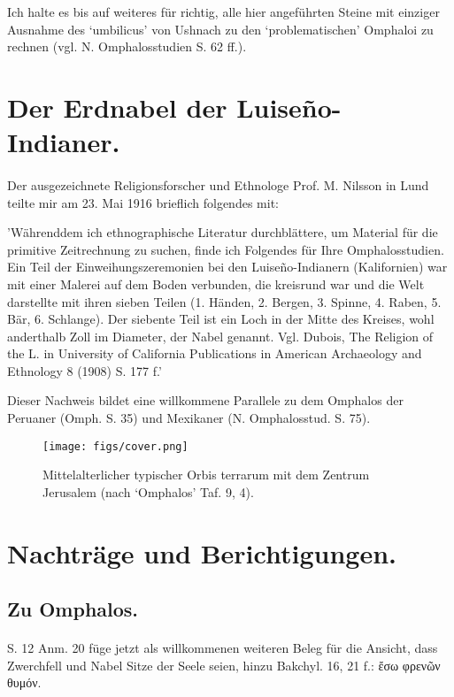 \documentclass[a4paper, 11pt, oneside]{article}
\begin{document}
Ich halte es bis auf weiteres für richtig, alle hier angeführten Steine mit einziger Ausnahme des `umbilicus' von Ushnach zu den `problematischen' Omphaloi zu rechnen (vgl. N. Omphalosstudien S. 62 ff.).
\clearpage
\section{Der Erdnabel der Luiseño-Indianer.}
\paragraph{}
Der ausgezeichnete Religionsforscher und Ethnologe Prof. M. Nilsson in Lund teilte mir am 23. Mai 1916 brieflich folgendes mit:

'Währenddem ich ethnographische Literatur durchblättere, um Material für die primitive Zeitrechnung zu suchen, finde ich Folgendes für Ihre Omphalosstudien. Ein Teil der Einweihungszeremonien bei den Luiseño-Indianern (Kalifornien) war mit einer Malerei auf dem Boden verbunden, die kreisrund war und die Welt darstellte mit ihren sieben Teilen (1. Händen, 2. Bergen, 3. Spinne, 4. Raben, 5. Bär, 6. Schlange). Der siebente Teil ist ein Loch in der Mitte des Kreises, wohl anderthalb Zoll im Diameter, der Nabel genannt. Vgl. Dubois, The Religion of the L. in University of California Publications in American Archaeology and Ethnology 8 (1908) S. 177 f.'

Dieser Nachweis bildet eine willkommene Parallele zu dem Omphalos der Peruaner (Omph. S. 35) und Mexikaner (N. Omphalosstud. S. 75).

\begin{figure}[H]
\centering
\texttt{[image: figs/cover.png]}
\caption*{Mittelalterlicher typischer Orbis terrarum mit dem Zentrum Jerusalem (nach `Omphalos' Taf. 9, 4).}
\end{figure}
\clearpage
\section{Nachträge und Berichtigungen.}
\subsection{Zu Omphalos.}
\paragraph{}
S. 12 Anm. 20 füge jetzt als willkommenen weiteren Beleg für die Ansicht, dass Zwerchfell und Nabel Sitze der Seele seien, hinzu Bakchyl. 16, 21 f.: ἔσω φρενῶν θυμόν.
\end{document}
